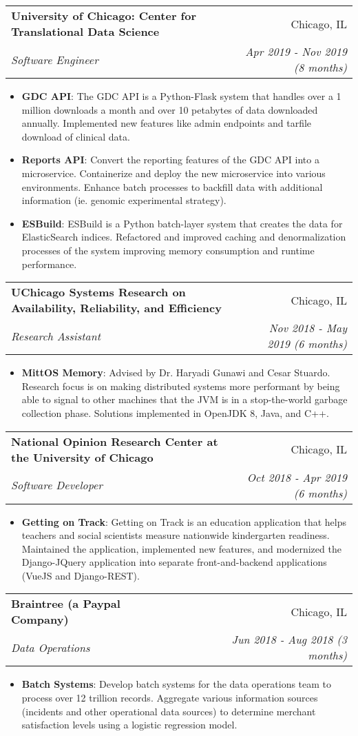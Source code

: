 \documentclass[letterpaper,11pt]{article}
\makeatletter
\newcommand{\resumeItem}[2]{
  \item\small{
    \textbf{#1}{: #2 \vspace{-2pt}}
  }
}
\newcommand{\resumeSubheading}[4]{
  \vspace{-1pt}\item
    \begin{tabular*}{0.97\textwidth}[t]{l@{\extracolsep{\fill}}r}
      \textbf{#1} & #2 \\
      \textit{\small#3} & \textit{\small #4} \\
    \end{tabular*}\vspace{-5pt}
}
\newcommand{\resumeItemListStart}{\begin{itemize}}
\newcommand{\resumeItemListEnd}{\end{itemize}\vspace{-5pt}}
\makeatother
\begin{document}
    \resumeSubheading
      {University of Chicago: Center for Translational Data Science}{Chicago, IL}
      {Software Engineer}{Apr 2019 - Nov 2019 (8 months)}
      \resumeItemListStart
        \resumeItem{GDC API}
          {The GDC API is a Python-Flask system that handles over a 1 million downloads a month and over 10 petabytes of data downloaded annually. Implemented new features like admin endpoints and tarfile download of clinical data.}
        \resumeItem{Reports API}
          {Convert the reporting features of the GDC API into a microservice. Containerize and deploy the new microservice into various environments. Enhance batch processes to backfill data with additional information (ie. genomic experimental strategy).}
        \resumeItem{ESBuild}
          {ESBuild is a Python batch-layer system that creates the data for ElasticSearch indices. Refactored and improved caching and denormalization processes of the system improving memory consumption and runtime performance.}
      \resumeItemListEnd

    \resumeSubheading
      {UChicago Systems Research on Availability, Reliability, and Efficiency}{Chicago, IL}
      {Research Assistant}{Nov 2018 - May 2019 (6 months)}
      \resumeItemListStart
        \resumeItem{MittOS Memory}
          {Advised by Dr. Haryadi Gunawi and Cesar Stuardo. Research focus is on making distributed systems more performant by being able to signal to other machines that the JVM is in a stop-the-world garbage collection phase. Solutions implemented in OpenJDK 8, Java, and C++.}
      \resumeItemListEnd

    \resumeSubheading
      {National Opinion Research Center at the University of Chicago}{Chicago, IL}
      {Software Developer}{Oct 2018 - Apr 2019 (6 months)}
      \resumeItemListStart
        \resumeItem{Getting on Track}
          {Getting on Track is an education application that helps teachers and social scientists measure nationwide kindergarten readiness. Maintained the application, implemented new features, and modernized the Django-JQuery application into separate front-and-backend applications (VueJS and Django-REST).}
      \resumeItemListEnd

    \resumeSubheading
      {Braintree (a Paypal Company)}{Chicago, IL}
      {Data Operations}{Jun 2018 - Aug 2018 (3 months)}
      \resumeItemListStart
        \resumeItem{Batch Systems}
          {Develop batch systems for the data operations team to process over 12 trillion records. Aggregate various information sources (incidents and other operational data sources) to determine merchant satisfaction levels using a logistic regression model.}
      \resumeItemListEnd
\end{document}
